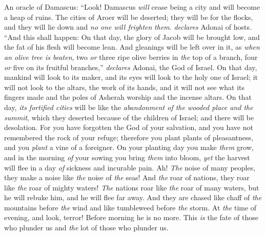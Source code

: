 \begin{biblechapter} %
 An oracle of Damascus:
\verse “Look! Damascus \textit{will} cease being a city 
and will become a heap of ruins.
\verse The cities of Aroer will be deserted; 
they will be for the flocks, 
and they will lie down and \textit{no one will frighten} \textit{them}. \textit{declares} Adonai of hosts.
\verse “And this shall happen:
\verse On that day, the glory of Jacob will be brought low, 
and the fat of his flesh will become lean.
\verse And gleanings will be left over in it, as \textit{when an olive tree is beaten}, two \textit{or} three ripe olive berries in \textit{the} top of a branch, 
four \textit{or} five on its fruitful branches,” \textit{declares} Adonai, the God of Israel.
\verse On that day, mankind will look to its maker, 
and its eyes will look to the holy one of Israel;
\verse it will not look to the altars, 
the work of its hands, 
and it will not see what its fingers made 
and the poles of Asherah worship and the incense altars.
\verse On that day, \textit{its fortified cities} will be like the \textit{abandonment of the wooded place and the summit}, which they deserted because of the children of Israel; and there will be desolation.
\verse For you have forgotten the God of your salvation, 
and you have not remembered the rock of your refuge; 
therefore you plant plants of pleasantness, 
and you \textit{plant} a vine of a foreigner.
\verse On your planting day you make \textit{them} grow, 
and in the morning \textit{of} your sowing you bring \textit{them} into bloom, 
\textit{yet} the harvest will flee in a day \textit{of} sickness and incurable pain.
 Ah! \textit{The} noise of many peoples, they make a noise like \textit{the} noise of \textit{the} seas! 
And \textit{the} roar of nations, they roar like \textit{the} roar of mighty waters!
\verse \textit{The} nations roar like \textit{the} roar of many waters, 
but he will rebuke him, and he will flee far away. 
And they are chased like chaff of \textit{the} mountains before \textit{the} wind 
and like tumbleweed before \textit{the} storm.
\verse At \textit{the} time of evening, and look, terror! 
Before morning he is no more. 
This \textit{is} the fate of those who plunder us 
and \textit{the} lot of those who plunder us.
\end{biblechapter}

